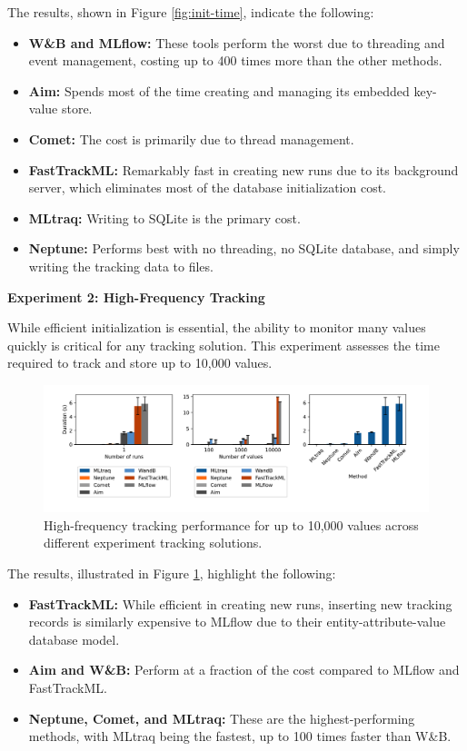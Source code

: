 \begin{itemize}
The results, shown in Figure \ref{fig:init-time}, indicate the following:

\begin{itemize}
    \item \textbf{W\&B and MLflow:} These tools perform the worst due to threading and event management, costing up to 400 times more than the other methods.
    \item \textbf{Aim:} Spends most of the time creating and managing its embedded key-value store.
    \item \textbf{Comet:} The cost is primarily due to thread management.
    \item \textbf{FastTrackML:} Remarkably fast in creating new runs due to its background server, which eliminates most of the database initialization cost.
    \item \textbf{MLtraq:} Writing to SQLite is the primary cost.
    \item \textbf{Neptune:} Performs best with no threading, no SQLite database, and simply writing the tracking data to files.\newline
\end{itemize}

\textbf{Experiment 2: High-Frequency Tracking}

While efficient initialization is essential, the ability to monitor many values quickly is critical for any tracking solution. This experiment assesses the time required to track and store up to 10,000 values.

\begin{figure}[h!]
    \centering
    \includegraphics[width=\textwidth]{images/mltraq/mltraq-high-frequency.png}
    \caption{High-frequency tracking performance for up to 10,000 values across different experiment tracking solutions.}
    \label{fig:high-freq}
\end{figure}

The results, illustrated in Figure \ref{fig:high-freq}, highlight the following:

\begin{itemize}
    \item \textbf{FastTrackML:} While efficient in creating new runs, inserting new tracking records is similarly expensive to MLflow due to their entity-attribute-value database model.
    \item \textbf{Aim and W\&B:} Perform at a fraction of the cost compared to MLflow and FastTrackML.
    \item \textbf{Neptune, Comet, and MLtraq:} These are the highest-performing methods, with MLtraq being the fastest, up to 100 times faster than W\&B.\newline
\end{itemize}


\end{itemize}
